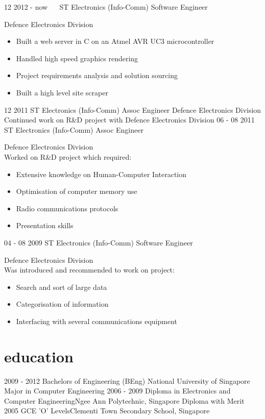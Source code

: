\documentclass[]{friggeri-cv}
\begin{document}
\begin{entrylist}
	\entry
	{12 2012 - now   \ \ }
	{ST Electronics (Info-Comm)}
	{Software Engineer}
	{Defence Electronics Division
	\begin{itemize}[itemsep=0pt,topsep=0pt]
	\item Built a web server in C on an Atmel AVR UC3 microcontroller
	\item Handled high speed graphics rendering
	\item Project requirements analysis and solution sourcing
	\item Built a high level site scraper
	\end{itemize}}
	\entry
	{12 2011 }
	{ST Electronics (Info-Comm)}
	{Assoc Engineer}
	{Defence Electronics Division \\ Continued work on R\&D project with Defence Electronics Division}{}
	\entry
	{06 - 08 2011 }
	{ST Electronics (Info-Comm)}
	{Assoc Engineer}
	{Defence Electronics Division \\Worked on R\&D project which required:
	\begin{itemize}[itemsep=0pt,topsep=0pt]
	\item Extensive knowledge on Human-Computer Interaction
	\item Optimisation of computer memory use
	\item Radio communications protocols
	\item Presentation skills
	\end{itemize}}
	\entry
	{04 - 08 2009}
	{ST Electronics (Info-Comm)}
	{Software Engineer}
	{Defence Electronics Division \\Was introduced and recommended to work on project:
	\begin{itemize}[itemsep=0pt,topsep=0pt]
	\item Search and sort of large data
	\item Categorisation of information
	\item Interfacing with several communications equipment
	\end{itemize}}
\end{entrylist}

\section{education}

\begin{entrylist}
	\entry
	{2009 - 2012}
	{Bachelors of Engineering (BEng)}
	{National University of Singapore}
	{
		Major in Computer Engineering
	}
	\entry
	{2006 - 2009}
	{Diploma in Electronics and Computer Engineering}{Ngee Ann Polytechnic, Singapore}
	{
		Diploma with Merit\\
	}
	\entry
	{2005}
	{GCE 'O' Levels}{Clementi Town Secondary School, Singapore}
	{}
\end{entrylist}
\pagebreak
\end{document}
